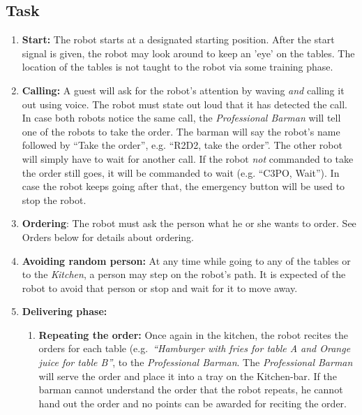 \subsection{Task}
\begin{enumerate}
	\item \textbf{Start:} The robot starts at a designated starting position. After the start signal is given, the robot may look around to keep an 'eye' on the tables.
	  The location of the tables is not taught to the robot via some training phase. 
	
	\item \textbf{Calling:} A guest will ask for the robot's attention by waving \emph{and} calling it out using voice. 
	  The robot must state out loud that it has detected the call.
	  In case both robots notice the same call, the \textit{Professional Barman} will tell one of the robots to take the order. 
	  The barman will say the robot's name followed by ``Take the order'', e.g. ``R2D2, take the order''. 
	  The other robot will simply have to wait for another call. 
	  If the robot \textit{not} commanded to take the order still goes, it will be commanded to wait (e.g. ``C3PO, Wait''). 
	  In case the robot keeps going after that, the emergency button will be used to stop the robot. 
	
	
	\item \textbf{Ordering}: The robot must ask the person what he or she wants to order. See Orders below for details about ordering.
	\item \textbf{Avoiding random person:} At any time while going to any of the tables or to the \textit{Kitchen}, a person may step on the robot's path. 
	  It is expected of the robot to avoid that person or stop and wait for it to move away.

	\item \textbf{Delivering phase:}
	\begin{enumerate}
		\item \textbf{Repeating the order:} Once again in the kitchen, the robot recites the orders for each table (e.g.~\textit{``Hamburger with fries for table A and Orange juice for table B''}, to the \textit{Professional Barman}. 
		  The \textit{Professional Barman} will serve the order and place it into a tray on the Kitchen-bar.
		  If the barman cannot understand the order that the robot repeats, he cannot hand out the order and no points can be awarded for reciting the order.


\end{enumerate}
\end{enumerate}
